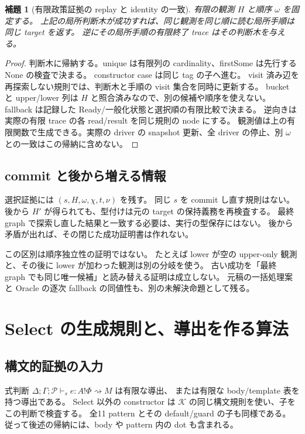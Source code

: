\documentclass[11pt,a4paper]{article}
\newtheorem{lemma}[definition]{補題}
\newcommand{\Core}{\mathcal K}
\newcommand{\Ctx}{\Delta;\Gamma;\mathcal P}
\begin{document}
\begin{lemma}[有限政策証拠の replay と identity の一致]
有限の観測 \(H\) と順序 \(\omega\) を固定する。
上記の局所判断木が成功すれば、同じ観測を同じ順に読む局所手順は同じ target を返す。
逆にその局所手順の有限終了 trace はその判断木を与える。
\end{lemma}
\begin{proof}
判断木に帰納する。unique は有限列の cardinality、firstSome は先行する None の検査で決まる。
constructor case は同じ tag の子へ進む。
visit 済み辺を再探索しない規則では、判断木と手順の visit 集合を同時に更新する。
bucket と upper/lower 列は \(H\) と照合済みなので、別の候補や順序を使えない。
fallback は記録した Ready/一般化状態と選択順の有限比較で決まる。
逆向きは実際の有限 trace の各 read/result を同じ規則の node にする。
観測値は上の有限関数で生成できる。実際の driver の snapshot 更新、全 driver の停止、別 \(\omega\) との一致はこの帰納に含めない。
\end{proof}

\subsection{commit と後から増える情報}

選択証拠には \((s,H,\omega,\chi,t,\nu)\) を残す。
同じ \(s\) を commit し直す規則はない。
後から \(H'\) が得られても、型付けは元の target の保持義務を再検査する。
最終 graph で探索し直した結果と一致する必要は、実行の型保存にはない。
後から矛盾が出れば、その閉じた成功証明書は作れない。

この区別は順序独立性の証明ではない。
たとえば lower が空の upper-only 観測と、その後に lower が加わった観測は別の分岐を使う。
古い成功を「最終 graph でも同じ唯一候補」と読み替える証明は成立しない。
元稿の一括処理案と Oracle の逐次 fallback の同値性も、別の未解決命題として残る。

\section{Select の生成規則と、導出を作る算法}
\label{sec:select}

\subsection{構文的証拠の入力}

式判断 \(\Ctx\vdash_s e:A!\Phi\rightsquigarrow M\) は有限な導出、
または有限な body/template 表を持つ導出である。
Select 以外の constructor は \(\Core\) の同じ構文規則を使い、子をこの判断で検査する。
全11 pattern とその default/guard の子も同様である。
従って後述の帰納には、body や pattern 内の dot も含まれる。
\end{document}
